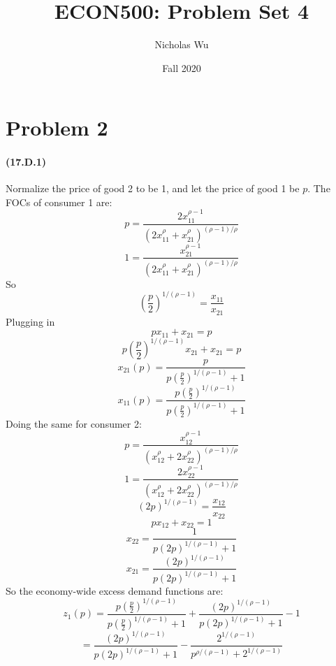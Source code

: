 \documentclass[10pt,letter]{article}
\begin{document}


\title{ECON500: Problem Set 4}

\author{Nicholas Wu}

\date{Fall 2020}

\maketitle


\section*{Problem 2}
\paragraph{(17.D.1)}
Normalize the price of good 2 to be 1, and let the price of good 1 be $p$. The FOCs of consumer 1 are:
\[ p = \frac{2x_{11}^{\rho-1}}{(2x_{11}^\rho + x_{21}^\rho)^{(\rho-1)/\rho}} \]
\[ 1 = \frac{x_{21}^{\rho-1}}{(2x_{11}^\rho + x_{21}^\rho)^{(\rho-1)/\rho}} \]
So
\[ \left(\frac{p}{2} \right)^{1/(\rho-1)}= \frac{x_{11}}{x_{21}} \]
Plugging in
\[ px_{11} + x_{21} = p \]
\[ p\left(\frac{p}{2} \right)^{1/(\rho-1)}x_{21} + x_{21} = p \]
\[ x_{21}(p) = \frac{p}{p\left(\frac{p}{2} \right)^{1/(\rho-1)} + 1} \]
\[ x_{11}(p) = \frac{p\left(\frac{p}{2} \right)^{1/(\rho-1)}}{p\left(\frac{p}{2} \right)^{1/(\rho-1)} + 1} \]
Doing the same for consumer 2:
\[ p = \frac{x_{12}^{\rho-1}}{(x_{12}^\rho + 2x_{22}^\rho)^{(\rho-1)/\rho}} \]
\[ 1 = \frac{2x_{22}^{\rho-1}}{(x_{12}^\rho + 2x_{22}^\rho)^{(\rho-1)/\rho}} \]
\[ (2p)^{1/(\rho-1)} = \frac{x_{12}}{x_{22}}  \]
\[ px_{12} + x_{22} = 1 \]
\[x_{22} = \frac{1}{ p(2p)^{1/(\rho-1)} + 1} \]
\[x_{21} = \frac{(2p)^{1/(\rho-1)}}{ p(2p)^{1/(\rho-1)} + 1} \]
So the economy-wide excess demand functions are:
\[ z_1(p) = \frac{p\left(\frac{p}{2} \right)^{1/(\rho-1)}}{p\left(\frac{p}{2} \right)^{1/(\rho-1)} + 1} + \frac{(2p)^{1/(\rho-1)}}{ p(2p)^{1/(\rho-1)} + 1} - 1\]
\[ = \frac{(2p)^{1/(\rho-1)}}{ p(2p)^{1/(\rho-1)} + 1} - \frac{2^{1/(\rho-1)}}{p^{\rho/(\rho-1)} + 2^{1/(\rho-1)}} \]
\end{document}
